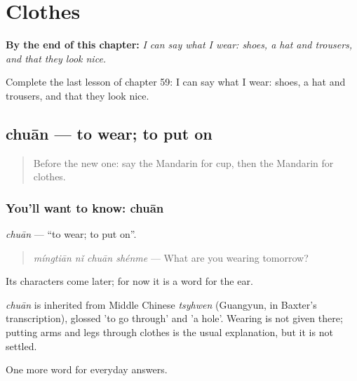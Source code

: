 
\chapter{Clothes}
\label{ch:zh-clothes}

\begin{chapteropening}
\textbf{By the end of this chapter:} \emph{I can say what I wear: shoes, a hat and trousers, and that they look nice.}

Complete the last lesson of chapter 59: I can say what I wear: shoes, a hat and trousers, and that they look nice.
\end{chapteropening}

\section[chuān]{chuān — to wear; to put on}

\label{lesson:ZH-C59-chuan}



\begin{quote}
Before the new one: say the Mandarin for cup, then the Mandarin for clothes.
\end{quote}

\subsection*{You'll want to know: chuān}
\emph{chuān} — \textquotedblleft{}to wear; to put on\textquotedblright{}.

\begin{quote}
\emph{míngtiān nǐ chuān shénme} — What are you wearing tomorrow?
\end{quote}

Its characters come later; for now it is a word for the ear.

\begin{cousinweb}
\emph{chuān} is inherited from Middle Chinese \emph{tsyhwen} (Guangyun, in Baxter's transcription), glossed 'to go through' and 'a hole'. Wearing is not given there; putting arms and legs through clothes is the usual explanation, but it is not settled.
\end{cousinweb}

\begin{grammarlens}[title={What you've built}]
One more word for everyday answers.
\end{grammarlens}

